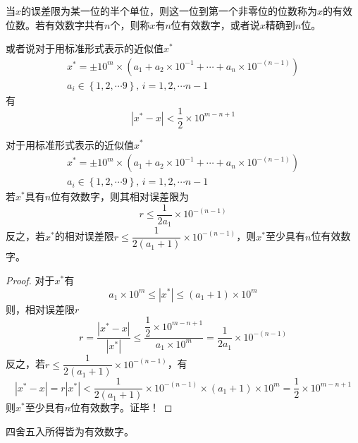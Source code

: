 \begin{definition}[有效数字]
    当$x$的误差限为\colorbox{yellow!50}{某一位}的半个单位，则\colorbox{yellow!50}{这一位}到第一个非零位的位数称为$x$的有效位数。若有效数字共有$n$个，则称$x$有$n$位有效数字，或者说$x$精确到$n$位。
    
    或者说对于用标准形式表示的近似值$x^*$
    \[
        \begin{array}{c}
            x^* = \pm 10^m\times \left( a_1+a_2\times 10^{-1}+\cdots+a_n\times 10^{-(n-1)} \right)\\
            a_{i}\in\left\{ 1,2,\cdots 9 \right\},\,i = 1,2,\cdots n-1
        \end{array}
    \]
    有
    \[
        |x^*-x|< \dfrac{1}{2}\times 10^{m-n+1}
    \]
\end{definition}
\begin{theorem}
    对于用标准形式表示的近似值$x^*$
    \[
        \begin{array}{c}
            x^* = \pm 10^m\times \left( a_1+a_2\times 10^{-1}+\cdots+a_n\times 10^{-(n-1)} \right)\\
            a_{i}\in\left\{ 1,2,\cdots 9 \right\},\,i = 1,2,\cdots n-1
        \end{array}
    \]
    若$x^*$具有$n$位有效数字，则其相对误差限为
    \[
        r\leqslant \dfrac{1}{2a_1}\times 10^{-(n-1)}
    \]
    反之，若$x^*$的相对误差限$r\leqslant \dfrac{1}{2(a_1+1)}\times 10^{-(n-1)}$，则$x^*$至少具有$n$位有效数字。
\end{theorem}
\begin{proof}
    对于$x^*$有
    \[
        a_1\times 10^{m} \leqslant|x^*|\leqslant(a_1+1)\times 10^{m}  
    \]
    则，相对误差限$r$
    \[
        r = \dfrac{|x^*-x|}{|x^*|} \leqslant \dfrac{\dfrac{1}{2}\times 10^{m-n+1}}{a_1\times 10^{m}} = \dfrac{1}{2a_1}\times 10^{-(n-1)}
    \]
    反之，若$r\leqslant \dfrac{1}{2(a_1+1)}\times 10^{-(n-1)}$，有
    \[
        |x^*-x| = r|x^*|<\dfrac{1}{2(a_1+1)}\times 10^{-(n-1)}\times (a_1+1)\times 10^{m} = \dfrac{1}{2}\times 10^{m-n+1}
    \]
    则$x^*$至少具有$n$位有效数字。证毕！
\end{proof}
\begin{theorem}
    四舍五入所得皆为有效数字。
\end{theorem}
